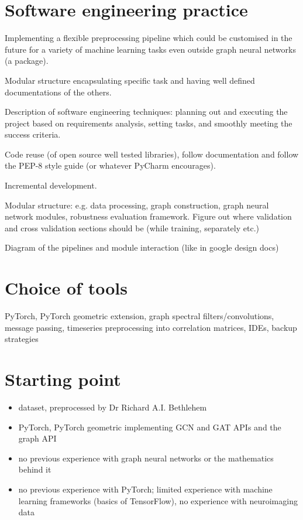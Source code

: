 \section{Software engineering practice}
Implementing a flexible preprocessing pipeline which could be customised in the future for a variety of machine learning tasks even outside graph neural networks (a package).

Modular structure encapsulating specific task and having well defined documentations of the others.

Description of software engineering techniques: planning out and executing the project based on requirements analysis, setting tasks, and smoothly meeting the success criteria.

Code reuse (of open source well tested libraries), follow documentation and follow the PEP-8 style guide (or whatever PyCharm encourages).

Incremental development.

Modular structure: e.g. data processing, graph construction, graph neural network modules, robustness evaluation framework. Figure out where validation and cross validation sections should be (while training, separately etc.)

Diagram of the pipelines and module interaction (like in google design docs)


\section{Choice of tools}
PyTorch, PyTorch geometric extension, graph spectral filters/convolutions, message passing, timeseries preprocessing into correlation matrices, IDEs, backup strategies

\section{Starting point}
\begin{itemize}
    \item dataset, preprocessed by Dr Richard A.I. Bethlehem
    \item PyTorch, PyTorch geometric implementing GCN and GAT APIs and the graph API
    \item no previous experience with graph neural networks or the mathematics behind it
    \item no previous experience with PyTorch; limited experience with machine learning frameworks (basics of TensorFlow), no experience with neuroimaging data
\end{itemize}
